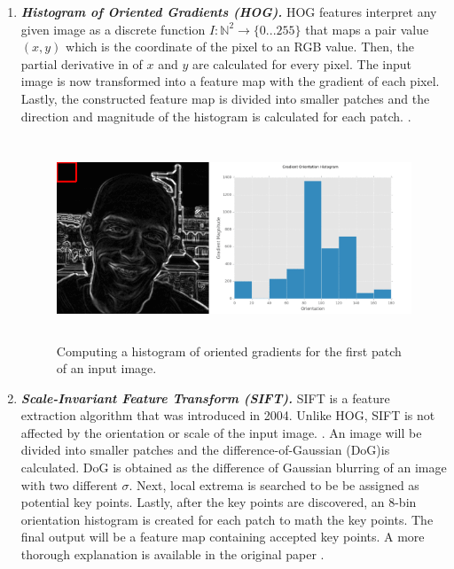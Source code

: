 \begin{enumerate}
    \item \textbf{\textit{Histogram of Oriented Gradients (HOG).}} HOG features interpret any given image as a discrete function $I : \mathbb{N}^2 \rightarrow \{0...255\}$ that maps a pair value $(x,y)$ which is the coordinate of the pixel to an RGB value. Then, the partial derivative in of \(x\) and \(y\) are calculated for every pixel. The input image is now transformed into a feature map with the gradient of each pixel. Lastly, the constructed feature map is divided into smaller patches and the direction and magnitude of the histogram is calculated for each patch. \cite{DBLP:journals/corr/Thoma16a}.

    \begin{figure}[ht]
    \includegraphics[width=12cm, height=6cm]{images/hog.png}
    \centering
    \caption{Computing a histogram of oriented gradients for the first patch of an input image.}
    \label{fig:hog}
    \end{figure}
    
    \item \textbf{\textit{Scale-Invariant Feature Transform (SIFT).}} SIFT is a feature extraction algorithm that was introduced in 2004. Unlike HOG, SIFT is not affected by the orientation or scale of the input image. \cite{DBLP:journals/corr/Thoma16a}. An image will be divided into smaller patches and the difference-of-Gaussian (DoG)is calculated. DoG is obtained as the difference of Gaussian blurring of an image with two different $\sigma$. Next, local extrema is searched to be be assigned as potential key points. Lastly, after the key points are discovered, an 8-bin orientation histogram is created for each patch to math the key points. The final output will be a feature map containing accepted key points. A more thorough explanation is available in the original paper \cite{SIFT}.


\end{enumerate}
